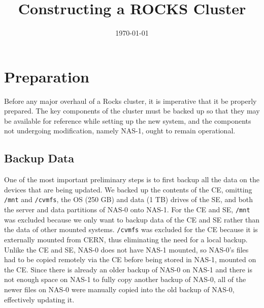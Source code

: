 \documentclass[12pt]{article}
\begin{document}

\title{Constructing a ROCKS Cluster}

\date{\today}

\thispagestyle{empty}

\maketitle

\newpage



\tableofcontents

\newpage



\section{Preparation}

\qq Before any major overhaul of a Rocks cluster, it is imperative that it be
properly prepared. The key components of the cluster must be backed up so that
they may be available for reference while setting up the new system, and the
components not undergoing modification, namely NAS-1, ought to remain
operational.

\subsection{Backup Data}

\qq One of the most important preliminary steps is to first backup all the data
on the devices that are being updated. We backed up the contents of the CE,
omitting {\tt /mnt} and {\tt /cvmfs}, the OS (250 GB) and data (1 TB) drives of
the SE, and both the server and data partitions of NAS-0 onto NAS-1. For the CE
and SE, {\tt /mnt} was excluded because we only want to backup data of the CE
and SE rather than the data of other mounted systems. {\tt /cvmfs} was excluded
for the CE because it is externally mounted from CERN, thus eliminating the need
for a local backup. Unlike the CE and SE, NAS-0 does not have NAS-1 mounted, so
NAS-0's files had to be copied remotely via the CE before being stored in NAS-1,
mounted on the CE. Since there is already an older backup of NAS-0 on NAS-1 and
there is not enough space on NAS-1 to fully copy another backup of NAS-0, all of
the newer files on NAS-0 were manually copied into the old backup of NAS-0,
effectively updating it.
\end{document}
